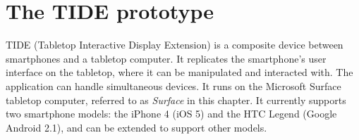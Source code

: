 

\chapter{The TIDE prototype}
\label{system}

TIDE (Tabletop Interactive Display Extension) is a composite device between smartphones and a tabletop computer.
It replicates the smartphone's user interface on the tabletop, where it can be manipulated and interacted with.
The application can handle simultaneous devices.
It runs on the Microsoft Surface tabletop computer, referred to as \emph{Surface} in this chapter.
It currently supports two smartphone models: the iPhone 4 (iOS 5) and the HTC Legend (Google Android 2.1), and can be extended to support other models.

